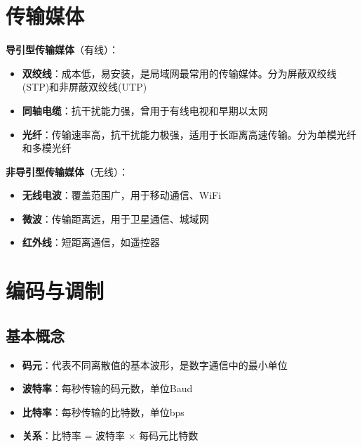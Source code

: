 \documentclass[12pt,a4paper,openany]{ctexbook}
\begin{document}
\section{传输媒体}
\begin{center}
\end{center}

\textbf{导引型传输媒体}（有线）：
\begin{itemize}[leftmargin=2em,itemsep=0pt]
    \item \textbf{双绞线}：成本低，易安装，是局域网最常用的传输媒体。分为屏蔽双绞线(STP)和非屏蔽双绞线(UTP)
    \item \textbf{同轴电缆}：抗干扰能力强，曾用于有线电视和早期以太网
    \item \textbf{光纤}：传输速率高，抗干扰能力极强，适用于长距离高速传输。分为单模光纤和多模光纤
\end{itemize}

\textbf{非导引型传输媒体}（无线）：
\begin{itemize}[leftmargin=2em,itemsep=0pt]
    \item \textbf{无线电波}：覆盖范围广，用于移动通信、WiFi
    \item \textbf{微波}：传输距离远，用于卫星通信、城域网
    \item \textbf{红外线}：短距离通信，如遥控器
\end{itemize}

\section{编码与调制}
\subsection{基本概念}
\begin{itemize}[leftmargin=2em,itemsep=0pt]
    \item \textbf{码元}：代表不同离散值的基本波形，是数字通信中的最小单位
    \item \textbf{波特率}：每秒传输的码元数，单位Baud
    \item \textbf{比特率}：每秒传输的比特数，单位bps
    \item \textbf{关系}：比特率 = 波特率 $\times$ 每码元比特数
\end{itemize}
\end{document}
